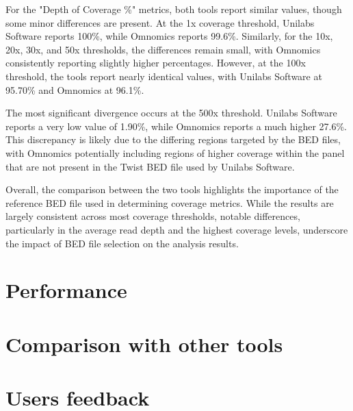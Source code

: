 For the "Depth of Coverage \%" metrics, both tools report similar values, though some minor differences are present. At the 1x coverage threshold, Unilabs Software reports 100\%, while Omnomics reports 99.6\%. Similarly, for the 10x, 20x, 30x, and 50x thresholds, the differences remain small, with Omnomics consistently reporting slightly higher percentages. However, at the 100x threshold, the tools report nearly identical values, with Unilabs Software at 95.70\% and Omnomics at 96.1\%.

The most significant divergence occurs at the 500x threshold. Unilabs Software reports a very low value of 1.90\%, while Omnomics reports a much higher 27.6\%. This discrepancy is likely due to the differing regions targeted by the BED files, with Omnomics potentially including regions of higher coverage within the panel that are not present in the Twist BED file used by Unilabs Software.

Overall, the comparison between the two tools highlights the importance of the reference BED file used in determining coverage metrics. While the results are largely consistent across most coverage thresholds, notable differences, particularly in the average read depth and the highest coverage levels, underscore the impact of BED file selection on the analysis results.

\section{Performance}


\section{Comparison with other tools}


\section{Users feedback}






